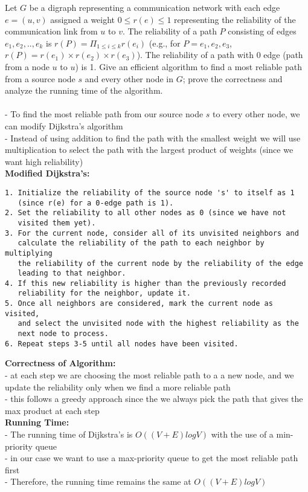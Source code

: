\documentclass[letterpaper,12pt]{article}
\begin{document}
\begin{enumerate}
Let $G$ be a digraph representing a communication network with each edge $e=(u,v)$
assigned a weight $0\leq r(e)\leq 1$ representing the reliability of the
communication link from $u$ to $v$. The reliability of a path $P$ consisting of
edges $e_1,e_2,..,e_k$ is $r(P)=\Pi_{1\leq i\leq k} r(e_i)$ (e.g., for
$P=e_1,e_2,e_3$, $r(P)=r(e_1)\times r(e_2)\times r(e_3)$). The reliability of a
path with 0 edge (path from a node $u$ to $u$) is 1. Give an efficient
algorithm to find a most reliable path from a source node $s$ and every other node
in $G$; prove the correctness and analyze the running time of the algorithm. \\ \\
- To find the most reliable path from our source node $s$ to every other node, we can modify Dijkstra's algorithm \\
- Instead of using addition to find the path with the smallest weight we will use multiplication to select the path with the largest product of weights (since we want high reliability) \\
\textbf{Modified Dijkstra's:}
\begin{verbatim}
1. Initialize the reliability of the source node 's' to itself as 1 
   (since r(e) for a 0-edge path is 1).
2. Set the reliability to all other nodes as 0 (since we have not 
   visited them yet).
3. For the current node, consider all of its unvisited neighbors and 
   calculate the reliability of the path to each neighbor by multiplying 
   the reliability of the current node by the reliability of the edge 
   leading to that neighbor.
4. If this new reliability is higher than the previously recorded 
   reliability for the neighbor, update it.
5. Once all neighbors are considered, mark the current node as visited, 
   and select the unvisited node with the highest reliability as the 
   next node to process.
6. Repeat steps 3-5 until all nodes have been visited.
\end{verbatim}

\textbf{Correctness of Algorithm:}\\
- at each step we are choosing the most reliable path to a a new node, and we update the reliability only when we find a more reliable path \\
- this follows a greedy approach since the we always pick the path that gives the max product at each step \\

\textbf{Running Time:} \\
- The running time of Dijkstra's is $O((V+E)logV)$ with the use of a min-priority queue \\
- in our case we want to use a max-priority queue to get the most reliable path first \\
- Therefore, the running time remains the same at $O((V+E)logV)$ \\


\end{enumerate}
\end{document}
